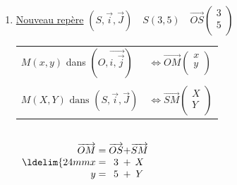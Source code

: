 \begin{enumerate}
\renewcommand{\theenumi}{\alph{enumi})}

\item \underline{Nouveau repère} $(S, \vec{i}, \vec{J}) \quad
                          S(3,5) \quad \overrightarrow{OS}\left(\begin{array}{c}
                                                                                 3\\
                                                                                 5\\
                                                                            \end{array} \right)$ \\
\begin{tabular}{l
                             @{$\;$}
                                             l}
$M(x,y)$ dans $(O, \vec{i, \vec{j}}) $ & $ \Longleftrightarrow \overrightarrow{OM}\left(\begin{array}{c}
                                                                                 x\\
                                                                                 y\\
                                                                            \end{array} \right)$ \\
   & \\                                            
$M(X, Y) \text { dans } (S, \vec{i}, \vec{J}) $ & $ \Longleftrightarrow \overrightarrow{SM}\left(\begin{array}{c}
                                                                                 X\\
                                                                                 Y\\
                                                                            \end{array} \right)$ \\
\end{tabular}\\

$
  \begin{array}{r@{\;}l@{\;}c@{}c@{}c}
     \overrightarrow{OM}  & = & \overrightarrow{OS} & + & \overrightarrow{SM}\\
    \ldelim\{{2}{4mm}  x   & = &              3                & +  & X \\
                                  y   & = &              5                & +  & Y \\
  \end{array}
$\\


\end{enumerate}
